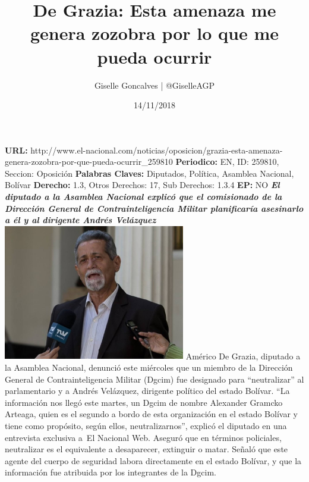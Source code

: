 \documentclass{article}%
\title{\textbf{De Grazia: Esta amenaza me genera zozobra por lo que me pueda ocurrir}}%
\author{Giselle Goncalves | @GiselleAGP}%
\date{14/11/2018}%
\begin{document}
%
\normalsize%
\maketitle%
\textbf{URL: }%
http://www.el{-}nacional.com/noticias/oposicion/grazia{-}esta{-}amenaza{-}genera{-}zozobra{-}por{-}que{-}pueda{-}ocurrir\_259810\newline%
%
\textbf{Periodico: }%
EN, %
ID: %
259810, %
Seccion: %
Oposición\newline%
%
\textbf{Palabras Claves: }%
Diputados, Política, Asamblea Nacional, Bolívar\newline%
%
\textbf{Derecho: }%
1.3, %
Otros Derechos: %
17, %
Sub Derechos: %
1.3.4\newline%
%
\textbf{EP: }%
NO\newline%
\newline%
%
\textbf{\textit{El diputado a la Asamblea Nacional explicó que el comisionado de la Dirección General de Contrainteligencia Militar planificaría asesinarlo a él y al dirigente Andrés Velázquez}}%
\newline%
\newline%
%
\includegraphics[width=300px]{168.jpg}%
\newline%
%
Américo De Grazia, diputado a la Asamblea Nacional, denunció este miércoles que un miembro de la Dirección General de Contrainteligencia Militar (Dgcim) fue designado para “neutralizar” al parlamentario y a Andrés Velázquez, dirigente político del estado Bolívar.%
\newline%
%
“La información nos llegó este martes, un Dgcim de nombre Alexander Gramcko Arteaga, quien es el segundo a bordo de esta organización en el estado Bolívar y tiene como propósito, según ellos, neutralizarnos”, explicó el diputado en una entrevista exclusiva a~El Nacional Web.%
\newline%
%
Aseguró que en términos policiales, neutralizar es el equivalente a desaparecer, extinguir o matar. Señaló que este agente del cuerpo de seguridad labora directamente en el estado Bolívar, y que la información fue atribuida por los integrantes de la Dgcim.%
\end{document}
